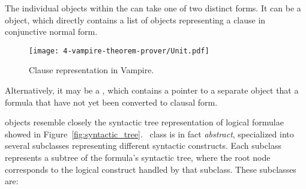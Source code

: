 The individual  objects within the  can take one of two distinct forms.
It can  be a  object, which directly contains a list of  objects representing a clause in conjunctive normal form.

\begin{figure}[H]
  \centering
  \texttt{[image: 4-vampire-theorem-prover/Unit.pdf]}
  \caption{Clause representation in Vampire.}\label{fig:clause-representation}
\end{figure}


Alternatively, it may be a , which contains a pointer to a separate  object that a formula that have not yet been converted to clausal form.

 objects resemble closely the syntactic tree representation of logical formulae showed in Figure~\ref{fig:syntactic_tree}.\  class is in fact \emph{abstract}, specialized into several subclasses representing different syntactic constructs.
Each subclass represents a subtree of the formula's syntactic tree, where the root node corresponds to the logical construct handled by that subclass.
These subclasses are:


